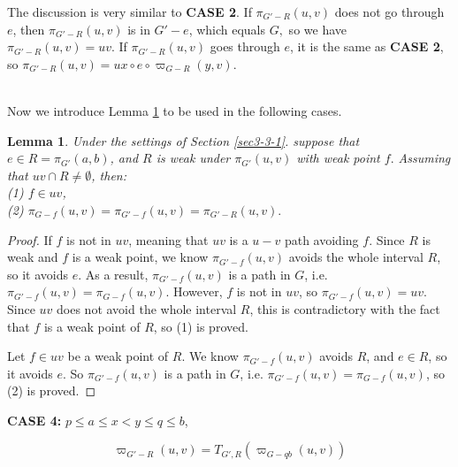\documentclass[11pt]{article}
\theoremstyle{plain}
\newtheorem{lemma}[theorem]{Lemma}
\theoremstyle{definition}
\newcommand{\new}[1]{\pi_{G'}(#1)}
\newcommand{\og}[3]{\pi_{G-#3}\left(#1,#2\right)}
\newcommand{\nng}[3]{\pi_{G'-#3}\left(#1,#2\right)}
\newcommand{\odg}[3]{\varpi_{G-#3}\left(#1,#2\right)}
\newcommand{\ndg}[3]{\varpi_{G'-#3}\left(#1,#2\right)}
\newcommand{\pp}[1]{T_{G',R}\left(#1\right)}
\begin{document}
The discussion is very similar to \textbf{CASE 2}. If $\nng{u}{v}{R}$ does not go through $e$, then $\nng{u}{v}{R}$ is in $G'-e$, which equals $G,$ so we have $\nng{u}{v}{R}=uv$. If $\nng{u}{v}{R}$ goes through $e$, it is the same as \textbf{CASE 2}, so $\nng{u}{v}{R}=ux\circ e\circ\odg{y}{v}{R}$.





~\\
Now we introduce Lemma \ref{thm4-1} to be used in the following cases.

\begin{lemma}\label{thm4-1}
    Under the settings of Section \ref{sec3-3-1}. suppose that $e\in R=\new{a,b}$, and $R$ is weak under $\new{u,v}$ with weak point $f.$ Assuming that $uv\cap R\neq\emptyset$, then:\\
    (1) $f\in uv$,\\
    (2) $\og{u}{v}{f}=\nng{u}{v}{f}=\nng{u}{v}{R}.$
\end{lemma}

\begin{proof}
If $f$ is not in $uv$, meaning that $uv$ is a $u-v$ path avoiding $f.$ Since $R$ is weak and $f$ is a weak point, we know $\nng{u}{v}{f}$ avoids the whole interval $R$, so it avoids $e$. As a result, $\nng{u}{v}{f}$ is a path in $G$, i.e. $\nng{u}{v}{f}=\og{u}{v}{f}.$ However, $f$ is not in $uv$, so $\nng{u}{v}{f}=uv$. Since $uv$ does not avoid the whole interval $R$, this is contradictory with the fact that $f$ is a weak point of $R$, so (1) is proved.

Let $f\in uv$ be a weak point of $R.$ We know $\nng{u}{v}{f}$ avoids $R$, and $e\in R$, so it avoids $e.$ So $\nng{u}{v}{f}$ is a path in $G$, i.e. $\nng{u}{v}{f}=\og{u}{v}{f}$, so (2) is proved.

\end{proof}



\noindent\textbf{CASE 4:} $p\le a\le x<y\le q\le b$,

$$\ndg{u}{v}{R}=\pp{\odg{u}{v}{qb}} $$
\end{document}
